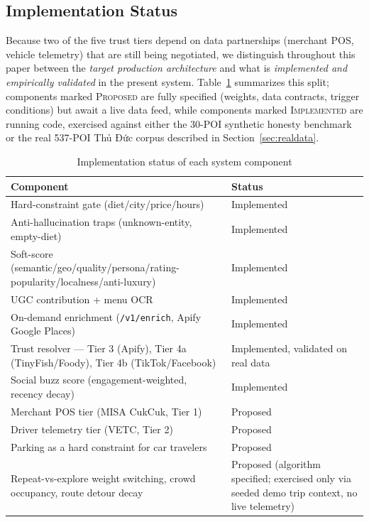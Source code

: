 \documentclass[acmsmall,screen]{acmart}
\begin{document}
\subsection{Implementation Status}
\label{sec:impl-status}
Because two of the five trust tiers depend on data partnerships (merchant POS, vehicle telemetry) that are still being negotiated, we distinguish throughout this paper between the \emph{target production architecture} and what is \emph{implemented and empirically validated} in the present system. Table~\ref{tab:impl-status} summarizes this split; components marked \textsc{Proposed} are fully specified (weights, data contracts, trigger conditions) but await a live data feed, while components marked \textsc{Implemented} are running code, exercised against either the 30-POI synthetic honesty benchmark or the real 537-POI Thủ Đức corpus described in Section~\ref{sec:realdata}.

\begin{table}[h]
\centering
\caption{Implementation status of each system component}
\label{tab:impl-status}
\begin{tabular}{p{4.3cm}p{3.3cm}}
\toprule
\textbf{Component} & \textbf{Status} \\
\midrule
Hard-constraint gate (diet/city/price/hours) & Implemented \\
Anti-hallucination traps (unknown-entity, empty-diet) & Implemented \\
Soft-score (semantic/geo/quality/persona/rating-popularity/localness/anti-luxury) & Implemented \\
UGC contribution + menu OCR & Implemented \\
On-demand enrichment (\texttt{/v1/enrich}, Apify Google Places) & Implemented \\
Trust resolver — Tier 3 (Apify), Tier 4a (TinyFish/Foody), Tier 4b (TikTok/Facebook) & Implemented, validated on real data \\
Social buzz score (engagement-weighted, recency decay) & Implemented \\
Merchant POS tier (MISA CukCuk, Tier 1) & Proposed \\
Driver telemetry tier (VETC, Tier 2) & Proposed \\
Parking as a hard constraint for car travelers & Proposed \\
Repeat-vs-explore weight switching, crowd occupancy, route detour decay & Proposed (algorithm specified; exercised only via seeded demo trip context, no live telemetry) \\
\bottomrule
\end{tabular}
\end{table}
\end{document}
